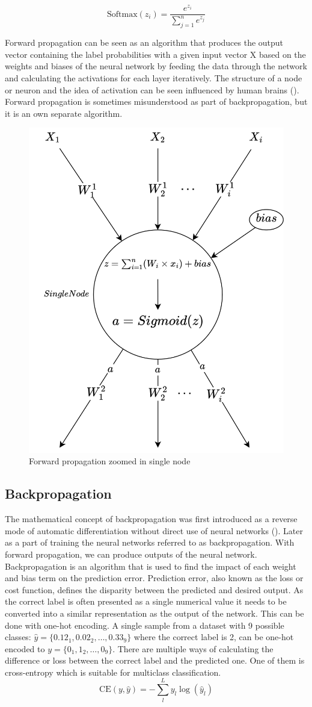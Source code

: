 \[\mathrm{Softmax}(z_{i}) = \frac{e^{z_{i}}}{\sum_{j=1}^{n}e^{z_{j}}}\]

Forward propagation can be seen as an algorithm that produces the output vector containing the label probabilities with a given input vector X based on the weights and biases of the neural network by feeding the data through the network and calculating the activations for each layer iteratively. The structure of a node or neuron and the idea of activation can be seen influenced by human brains (\cite{Rosenblatt1958ThePA}). Forward propagation is sometimes misunderstood as part of backpropagation, but it is an own separate algorithm.

\begin{figure}
    \centering
    \includegraphics[width=0.5\linewidth]{template//figures/singlenode.png}
    \caption{Forward propagation zoomed in single node}
    \label{fig:singlenode}
\end{figure}


\subsection{Backpropagation}

The mathematical concept of backpropagation was first introduced as a reverse mode of automatic differentiation without direct use of neural networks (\cite{linna}). Later as a part of training the neural networks referred to as backpropagation. With forward propagation, we can produce outputs of the neural network. Backpropagation is an algorithm that is used to find the impact of each weight and bias term on the prediction error. Prediction error, also known as the loss or cost function, defines the disparity between the predicted and desired output. As the correct label is often presented as a single numerical value it needs to be converted into a similar representation as the output of the network. This can be done with one-hot encoding. A single sample from a dataset with 9 possible classes: \(\hat{y} = \{ {0.12}_1, {0.02}_2, \ldots,{0.33}_9 \}\) where the correct label is 2, can be one-hot encoded to \(y = \{ {0}_1, {1}_2, \ldots,{0}_9 \}\). There are multiple ways of calculating the difference or loss between the correct label and the predicted one. One of them is cross-entropy which is suitable for multiclass classification. 
\[\mathrm{CE}(y,\hat{y}) = -\sum_{l}^{L} y_{l} \log(\hat{y}_{l})\]

